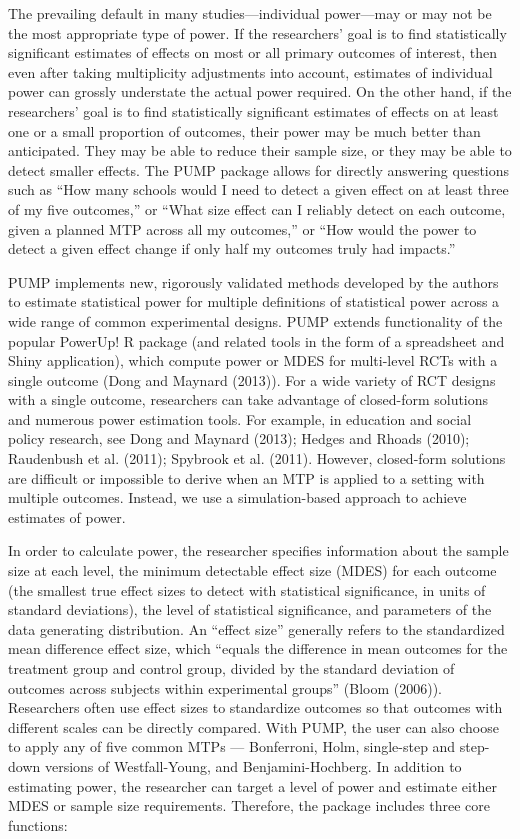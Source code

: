 \documentclass[
]{article}
\begin{document}
The prevailing default in many studies---individual power---may or may
not be the most appropriate type of power. If the researchers' goal is
to find statistically significant estimates of effects on most or all
primary outcomes of interest, then even after taking multiplicity
adjustments into account, estimates of individual power can grossly
understate the actual power required. On the other hand, if the
researchers' goal is to find statistically significant estimates of
effects on at least one or a small proportion of outcomes, their power
may be much better than anticipated. They may be able to reduce their
sample size, or they may be able to detect smaller effects. The PUMP
package allows for directly answering questions such as ``How many
schools would I need to detect a given effect on at least three of my
five outcomes,'' or ``What size effect can I reliably detect on each
outcome, given a planned MTP across all my outcomes,'' or ``How would
the power to detect a given effect change if only half my outcomes truly
had impacts.''

PUMP implements new, rigorously validated methods developed by the
authors to estimate statistical power for multiple definitions of
statistical power across a wide range of common experimental designs.
PUMP extends functionality of the popular PowerUp! R package (and
related tools in the form of a spreadsheet and Shiny application), which
compute power or MDES for multi-level RCTs with a single outcome (Dong
and Maynard (2013)). For a wide variety of RCT designs with a single
outcome, researchers can take advantage of closed-form solutions and
numerous power estimation tools. For example, in education and social
policy research, see Dong and Maynard (2013); Hedges and Rhoads (2010);
Raudenbush et al. (2011); Spybrook et al. (2011). However, closed-form
solutions are difficult or impossible to derive when an MTP is applied
to a setting with multiple outcomes. Instead, we use a simulation-based
approach to achieve estimates of power.

In order to calculate power, the researcher specifies information about
the sample size at each level, the minimum detectable effect size (MDES)
for each outcome (the smallest true effect sizes to detect with
statistical significance, in units of standard deviations), the level of
statistical significance, and parameters of the data generating
distribution. An ``effect size'' generally refers to the standardized
mean difference effect size, which ``equals the difference in mean
outcomes for the treatment group and control group, divided by the
standard deviation of outcomes across subjects within experimental
groups'' (Bloom (2006)). Researchers often use effect sizes to
standardize outcomes so that outcomes with different scales can be
directly compared. With PUMP, the user can also choose to apply any of
five common MTPs --- Bonferroni, Holm, single-step and step-down
versions of Westfall-Young, and Benjamini-Hochberg. In addition to
estimating power, the researcher can target a level of power and
estimate either MDES or sample size requirements. Therefore, the package
includes three core functions:
\end{document}
